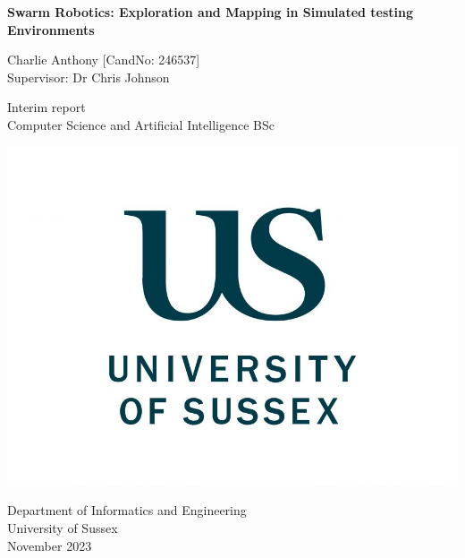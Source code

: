 \documentclass[12pt]{article}
\begin{document}
\begin{titlepage}
    \centering
    \vspace*{5cm}

    \Large
    \textbf{Swarm Robotics: Exploration and Mapping in Simulated testing Environments}

    \vspace{1cm}

    Charlie Anthony [CandNo: 246537]\\
    Supervisor: Dr Chris Johnson



    \vfill

    \vspace{1cm}

    \small
    Interim report\\
    Computer Science and Artificial Intelligence BSc

    \includegraphics[width=0.3\linewidth]{sussex_logo.jpg}


    \small
    Department of Informatics and Engineering\\
    University of Sussex\\
    November 2023
\end{titlepage}

\tableofcontents
\newpage

\end{document}
